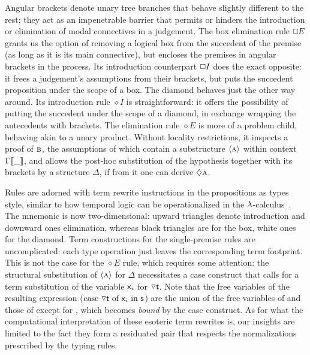 Angular brackets denote unary tree branches that behave slightly different to the rest; they act as an impenetrable barrier that permits or hinders the introduction or elimination of modal connectives in a judgement.
The box elimination rule $\bx E$ grants us the option of removing a logical box from the succedent of the premise (as long as it is its main connective), but encloses the premises in angular brackets in the process.
Its introduction counterpart $\bx I$ does the exact opposite: it frees a judgement's assumptions from their brackets, but puts the succedent proposition under the scope of a box.
The diamond behaves just the other way around.
Its introduction rule $\diamond I$ is straightforward: it offers the possibility of putting the succedent under the scope of a diamond, in exchange wrapping the antecedents with brackets.
The elimination rule $\diamond E$ is more of a problem child, behaving akin to a unary product.
Without locality restrictions, it inspects a proof of $\normalfont\textsc{b}$, the assumptions of which contain a substructure $\langle{\ensuremath{\normalfont\textsc{a}}}\rangle$ within context $\Gamma{\llbracket{\_}\rrbracket}$, and allows the post-hoc substitution of the hypothesis together with its brackets by a structure $\Delta$, if from it one can derive $\diamond \smallprop{a}$.

Rules are adorned with term rewrite instructions in the propositions as types style, similar to how temporal logic can be operationalized in the $\mathnormal{\lambda}$-calculus~\cite{wansing2002sequent}.
The mnemonic is now two-dimensional: upward triangles denote introduction and downward ones elimination, whereas black triangles are for the box, white ones for the diamond.
Term constructions for the single-premise rules are uncomplicated: each type operation just leaves the corresponding term footprint.
This is not the case for the $\diamond E$ rule, which requires some attention:
the structural substitution of $\langle{\ensuremath{\normalfont\textsc{a}}}\rangle$ for $\Delta$ necessitates a case construct that calls for a term substitution of the variable $\mathsf{\mathsf{x}_{\mathnormal{i}} }$ for $\diaelim\smallterm{t}$.
Note that the free variables of the resulting expression ($\caseof{\diaelim t}{\vari }{s}$) are the union of the free variables of  and those of  except for \smallterm{\vari }, which becomes \textit{bound} by the case construct.
As for what the computational interpretation of these esoteric term rewrites is, our insights are limited to the fact they form a residuated pair that respects the normalizations prescribed by the typing rules.

